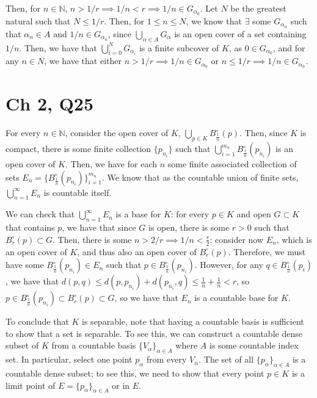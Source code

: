 \documentclass[12pt,letterpaper]{article}
\theoremstyle{definition}
\newcommand{\N}{\mathbb{N}}
\begin{document}
Then, for $n \in \N$, $n > 1/r \implies 1/n < r \implies 1/n \in G_{\alpha_{0}}$. Let $N$ be the greatest natural such that $N \leq 1/r$. Then, for $1 \leq n \leq N$, we know that $\exists$ some $G_{\alpha_{n}}$ such that $\alpha_{n} \in A$ and $1/n \in G_{\alpha_{n}}$, since $\bigcup_{\alpha \in A}G_{\alpha}$ is an open cover of a set containing $1/n$. Then, we have that $\bigcup_{i=0}^{N}G_{\alpha_{i}}$ is a finite subcover of $K$, as $0 \in G_{\alpha_{0}}$, and for any $n \in N$, we have that either $n > 1/r \implies 1/n \in G_{\alpha_{0}}$ or $n \leq 1/r \implies 1/n \in G_{\alpha_{n}}$.

\section*{Ch 2, Q25}

For every $n \in \N$, consider the open cover of $K$, $\bigcup_{p \in K}B_{\frac{1}{n}}^{\circ}(p)$. Then, since $K$ is compact, there is some finite collection $\{p_{n_{i}}\}$ such that $\bigcup_{i=1}^{m_{n}}B_{\frac{1}{n}}^{\circ}(p_{n_{i}})$ is an open cover of $K$. Then, we have for each $n$ some finite associated collection of sets $E_{n} = \{B_{\frac{1}{n}}^{\circ}(p_{n_{i}})\}_{i=1}^{m_{n}}$. We know that as the countable union of finite sets, $\bigcup_{n=1}^{\infty}E_{n}$ is countable itself.

We can check that $\bigcup_{n=1}^{\infty}E_{n}$ is a base for $K$: for every $p \in K$ and open $G \subset K$ that contains $p$, we have that since $G$ is open, there is some $r > 0$ such that $B_{r}^{\circ}(p) \subset G$. Then, there is some $n > 2/r \implies 1/n < \frac{r}{2}$; consider now $E_{n}$, which is an open cover of $K$, and thus also an open cover of $B_{r}^{\circ}(p)$. Therefore, we must have some $B_{\frac{1}{n}}^{\circ}(p_{n_{i}}) \in E_{n}$ such that $p \in B_{\frac{1}{n}}^{\circ}(p_{n_{i}})$. However, for any $q \in B_{\frac{1}{n}}^{\circ}(p_{i})$, we have that $d(p,q) \leq d(p,p_{n_{i}}) + d(p_{n_{i}}, q) \leq \frac{1}{n} + \frac{1}{n} < r$, so $p \in B_{\frac{1}{n}}^{\circ}(p_{n_{i}}) \subset B_{r}^{\circ}(p) \subset G$, so we have that $E_{n}$ is a countable base for $K$.

To conclude that $K$ is separable, note that having a countable basis is sufficient to show that a set is separable. To see this, we can construct a countable dense subset of $K$ from a countable basis $\{V_{\alpha}\}_{\alpha \in A}$ where $A$ is some countable index set. In particular, select one point $p_{\alpha}$ from every $V_{\alpha}$. The set of all $\{p_{\alpha}\}_{\alpha \in A}$ is a countable dense subset; to see this, we need to show that every point $p \in K$ is a limit point of $E = \{p_{\alpha}\}_{\alpha \in A}$ or in $E$.
\end{document}
